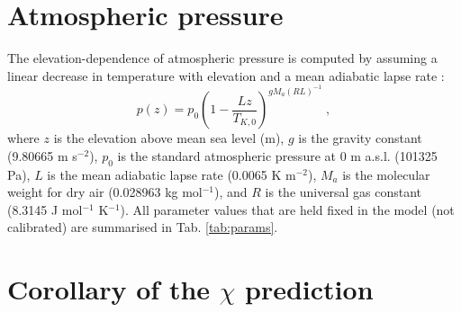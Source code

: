 \documentclass[gmd, manuscript]{copernicus}
\begin{document}
\section{Atmospheric pressure}
\label{sec:press}
The elevation-dependence of atmospheric pressure is computed by assuming a linear decrease in temperature with elevation and a mean adiabatic lapse rate \citep{berberan97}:
\begin{equation}
\label{eq:pz}
    p(z) = p_0 \left( 
      1 - \frac{L z}{T_{K,0}} 
    \right)^{g M_a (R L)^{-1}} \;,
\end{equation} 
where $z$ is the elevation above mean sea level (m), $g$ is the gravity constant (9.80665 m s$^{-2}$), $p_0$ is the standard atmospheric pressure at 0 m a.s.l. (101325 Pa), $L$ is the mean adiabatic lapse rate (0.0065 K m$^{-2}$), $M_a$ is the molecular weight for dry air (0.028963 kg mol$^{-1}$), and $R$ is the universal gas constant (8.3145 J mol$^{-1}$ K$^{-1}$). All parameter values that are held fixed in the model (not calibrated) are summarised in Tab. \ref{tab:params}.

\section{Corollary of the $\chi$ prediction}
\label{sec:corollary}
\end{document}
